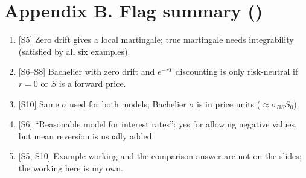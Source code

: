 \documentclass[10pt]{article}
\begin{document}
\section*{Appendix B. Flag summary (\flag)}
\begin{enumerate}
\item {}[S5] Zero drift gives a local martingale; true martingale needs integrability (satisfied by all six examples).
\item {}[S6--S8] Bachelier with zero drift and $e^{-rT}$ discounting is only risk-neutral if $r=0$ or $S$ is a forward price.
\item {}[S10] Same $\sigma$ used for both models; Bachelier $\sigma$ is in price units ($\approx\sigma_{BS}S_0$).
\item {}[S6] ``Reasonable model for interest rates'': yes for allowing negative values, but mean reversion is usually added.
\item {}[S5, S10] Example working and the comparison answer are not on the slides; the working here is my own.
\end{enumerate}
\end{document}
